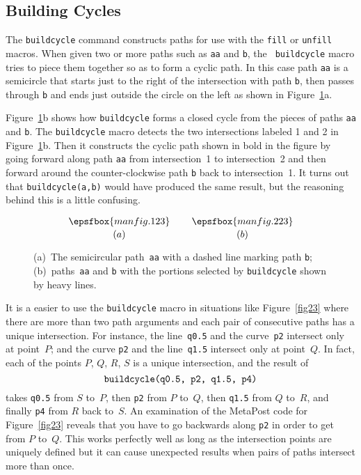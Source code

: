 \documentclass{article} %
\begin{document}
\subsection{Building Cycles}
\label{buildcy}

The {\tt buildcycle} command
constructs paths for use with the {\tt fill} or {\tt unfill} macros.
When given two or more paths such as {\tt aa} and {\tt b}, the {\tt
buildcycle} macro tries to piece them together so as to form a cyclic
path.  In this case path {\tt aa} is a semicircle that starts just to
the right of the intersection with path {\tt b}, then passes through
{\tt b} and ends just outside the circle on the left as shown in
Figure~\ref{fig22}a.

Figure~\ref{fig22}b shows how {\tt buildcycle} forms a closed cycle from
the pieces of paths {\tt aa} and {\tt b}.  The {\tt buildcycle} macro
detects the two intersections labeled 1 and 2 in
Figure~\ref{fig22}b.  Then it constructs the cyclic path shown in bold
in the figure by going forward along path {\tt aa} from intersection~1
to intersection~2 and then forward around the counter-clockwise path
{\tt b} back to intersection~1.  It turns out that {\tt buildcycle(a,b)}
would have produced the same result, but the reasoning behind this is a
little confusing.


\begin{figure}[htp]
$$ {\epsfbox{manfig.123} \atop (a)}
 \qquad {\epsfbox{manfig.223} \atop (b)}
$$
\caption[A demonstration of cycle building]
        {(a)~The semicircular path~{\tt aa}
        with a dashed line marking path {\tt b}; (b)~paths~{\tt aa} and {\tt b}
        with the portions selected by {\tt buildcycle} shown by heavy lines.}
\label{fig22}
\end{figure}

It is a easier to use the {\tt buildcycle} macro in situations like
Figure~\ref{fig23} where there are more than two path arguments and each
pair of consecutive paths has a unique intersection.  For instance, the
line~{\tt q0.5} and the curve~{\tt p2} intersect only at point~$P$; and
the curve {\tt p2} and the line~{\tt q1.5} intersect only at point~$Q$.
In fact, each of the points $P$, $Q$, $R$, $S$ is a unique intersection,
and the result of
$$ \hbox{\tt buildcycle(q0.5, p2, q1.5, p4)} $$
takes {\tt q0.5} from $S$ to~$P$, then {\tt p2} from $P$ to~$Q$, then
{\tt q1.5} from $Q$ to~$R$, and finally {\tt p4} from $R$ back to~$S$.
An examination of the MetaPost code for Figure~\ref{fig23} reveals that
you have to go backwards along {\tt p2} in order to get from $P$ to~$Q$.
This works perfectly well as long as the
intersection points are uniquely defined but it can
cause unexpected results when pairs of paths intersect more than once.
\end{document}

